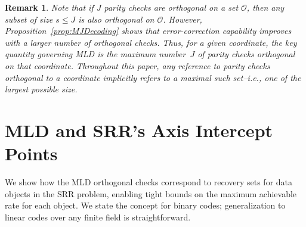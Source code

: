 \documentclass[conference,letterpaper]{IEEEtran}
\newtheorem{remark}{Remark}
\begin{document}
\begin{remark}
Note that if $J$ parity checks are \emph{orthogonal} on a set $\mathcal{O}$, then any subset of size $s \le J$ is also orthogonal on $\mathcal{O}$. However, Proposition~\ref{prop:MJDecoding} shows that error-correction capability improves with a larger number of orthogonal checks. Thus, for a given coordinate, the key quantity governing MLD is the maximum number~$J$ of parity checks orthogonal on that coordinate. Throughout this paper, any reference to parity checks orthogonal to a coordinate implicitly refers to a \emph{maximal} such set--i.e., one of the largest possible size.
\end{remark}
\section{MLD and SRR's Axis Intercept Points}\label{sec:SRR_MLD}
We show how the MLD orthogonal checks correspond to recovery sets for data objects in the SRR problem, enabling tight bounds on the maximum achievable rate for each object. We state the concept for binary codes; generalization to linear codes over any finite field is straightforward.



\end{document}
